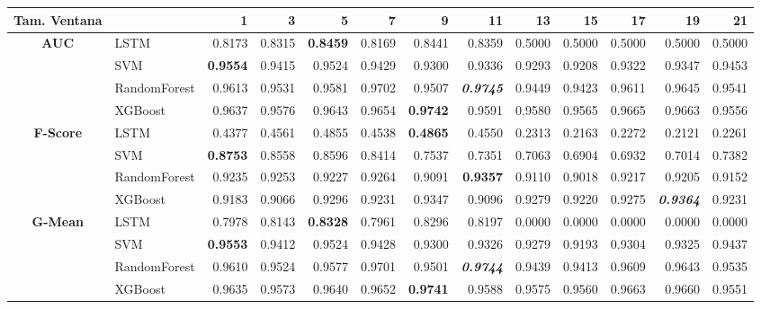 \begin{table}[H]
	\centering
	\begin{adjustbox}{max width=12cm}
		\begin{tabular}{|c|l|r|r|r|r|r|r|r|r|r|r|r|}
			\hline
			\textbf{Tam. Ventana}&         &      1  &      3  &      5  &      7  &      9  &      11 &      13 &      15 &      17 &      19 &      21 \\
			\hline
			\textbf{AUC} &  LSTM &  0.8173 &  0.8315 & \textbf{  0.8459 } &  0.8169 &  0.8441 &  0.8359 &  0.5000 &  0.5000 &  0.5000 &  0.5000 &  0.5000 \\
			&  SVM & \textbf{  0.9554 } &  0.9415 &  0.9524 &  0.9429 &  0.9300 &  0.9336 &  0.9293 &  0.9208 &  0.9322 &  0.9347 &  0.9453 \\
			&  RandomForest &  0.9613 &  0.9531 &  0.9581 &  0.9702 &  0.9507 & \textit{ \textbf{  0.9745 } } &  0.9449 &  0.9423 &  0.9611 &  0.9645 &  0.9541 \\
			&  XGBoost &  0.9637 &  0.9576 &  0.9643 &  0.9654 & \textbf{  0.9742 } &  0.9591 &  0.9580 &  0.9565 &  0.9665 &  0.9663 &  0.9556 \\
			\hline
			\textbf{F-Score} &  LSTM &  0.4377 &  0.4561 &  0.4855 &  0.4538 & \textbf{  0.4865 } &  0.4550 &  0.2313 &  0.2163 &  0.2272 &  0.2121 &  0.2261 \\
			&  SVM & \textbf{  0.8753 } &  0.8558 &  0.8596 &  0.8414 &  0.7537 &  0.7351 &  0.7063 &  0.6904 &  0.6932 &  0.7014 &  0.7382 \\
			&  RandomForest &  0.9235 &  0.9253 &  0.9227 &  0.9264 &  0.9091 & \textbf{  0.9357 } &  0.9110 &  0.9018 &  0.9217 &  0.9205 &  0.9152 \\
			&  XGBoost &  0.9183 &  0.9066 &  0.9296 &  0.9231 &  0.9347 &  0.9096 &  0.9279 &  0.9220 &  0.9275 & \textit{ \textbf{  0.9364 } } &  0.9231 \\
			\hline
			\textbf{G-Mean} &  LSTM &  0.7978 &  0.8143 & \textbf{  0.8328 } &  0.7961 &  0.8296 &  0.8197 &  0.0000 &  0.0000 &  0.0000 &  0.0000 &  0.0000 \\
			&  SVM & \textbf{  0.9553 } &  0.9412 &  0.9524 &  0.9428 &  0.9300 &  0.9326 &  0.9279 &  0.9193 &  0.9304 &  0.9325 &  0.9437 \\
			&  RandomForest &  0.9610 &  0.9524 &  0.9577 &  0.9701 &  0.9501 & \textit{ \textbf{  0.9744 } } &  0.9439 &  0.9413 &  0.9609 &  0.9643 &  0.9535 \\
			&  XGBoost &  0.9635 &  0.9573 &  0.9640 &  0.9652 & \textbf{  0.9741 } &  0.9588 &  0.9575 &  0.9560 &  0.9663 &  0.9660 &  0.9551 \\

\end{tabular}
\end{adjustbox}
\end{table}
